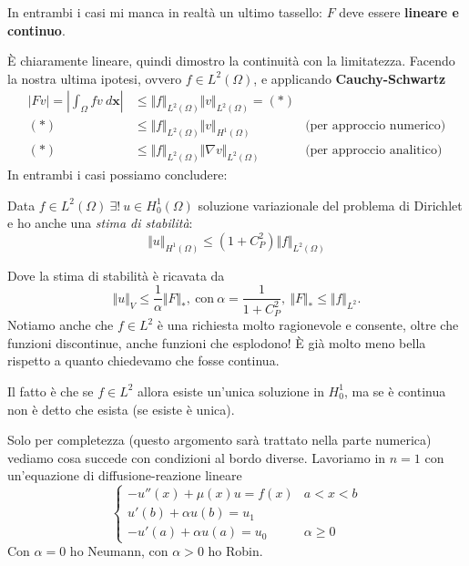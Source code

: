 \documentclass[10pt,a4paper,twoside,openright]{book}
\newcommand{\x}{\mathbf{x}}
\begin{document}
In entrambi i casi mi manca in realtà un ultimo tassello: $\displaystyle F$ deve essere \textbf{lineare e continuo}.

È chiaramente lineare, quindi dimostro la continuità con la limitatezza. Facendo la nostra ultima ipotesi, ovvero $\displaystyle f\in L^{2}( \Omega )$, e applicando \textbf{Cauchy-Schwartz}
\begin{align*}
	| Fv| =\left| \int _{\Omega } fv\ d\x\right| & \leqslant \Vert f\Vert _{L^{2}( \Omega )}\Vert v\Vert _{L^{2}( \Omega )} =( *)  &                                  \\
	( *)                                                 & \leqslant \Vert f\Vert _{L^{2}( \Omega )}\Vert v\Vert _{H^{1}( \Omega )}        & \text{(per approccio numerico)}  \\
	( *)                                                 & \leqslant \Vert f\Vert _{L^{2}( \Omega )}\Vert \nabla v\Vert _{L^{2}( \Omega )} & \text{(per approccio analitico)} 
\end{align*}
In entrambi i casi possiamo concludere:
\begin{theorem}
	Data $\displaystyle f\in L^{2}( \Omega ) \ \exists !\ u\in H_{0}^{1}( \Omega )$ soluzione variazionale del problema di Dirichlet e ho anche una \textit{stima di stabilità}:
	\begin{equation*}
		\Vert u\Vert _{H^{1}( \Omega )} \leqslant \left( 1+C_{P}^{2}\right)\Vert f\Vert _{L^{2}( \Omega )}
	\end{equation*}
\end{theorem}
Dove la stima di stabilità è ricavata da
\begin{equation*}
	\Vert u\Vert _{V} \leqslant \frac{1}{\alpha }\Vert F\Vert _{*} ,\ \text{con} \ \alpha =\frac{1}{1+C_{P}^{2}} ,\ \Vert F\Vert _{*} \leqslant \Vert f\Vert _{L^{2}} .
\end{equation*}
Notiamo anche che $\displaystyle f\in L^{2}$ è una richiesta molto ragionevole e consente, oltre che funzioni discontinue, anche funzioni che esplodono! È già molto meno bella rispetto a quanto chiedevamo che fosse continua.

Il fatto è che se $\displaystyle f\in L^{2}$ allora esiste un'unica soluzione in $\displaystyle H_{0}^{1}$, ma se è continua non è detto che esista (se esiste è unica).



Solo per completezza (questo argomento sarà trattato nella parte numerica) vediamo cosa succede con condizioni al bordo diverse. Lavoriamo in $\displaystyle n=1$ con un'equazione di diffusione-reazione lineare
\begin{equation*}
	\begin{cases}
		-u''( x) +\mu ( x) u=f( x)   & a< x< b            \\
		u'( b) +\alpha u( b) =u_{1}  &                    \\
		-u'( a) +\alpha u( a) =u_{0} & \alpha \geqslant 0 
	\end{cases}
\end{equation*}
Con $\displaystyle \alpha =0$ ho Neumann, con $\displaystyle \alpha  >0$ ho Robin.
\end{document}
